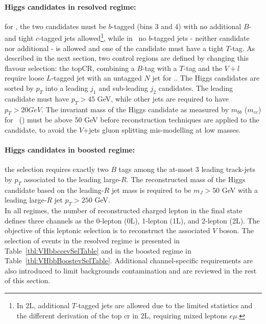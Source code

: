 \paragraph{Higgs candidates in resolved regime:} for \vhb, the two candidates must be $b$-tagged (bins 3 and 4) with no additional $B$- and tight $c$-tagged jets allowed\footnote{In 2L, additional $T$-tagged jets are allowed due to the limited statistics and the different derivation of the top \gls{cr} in 2L, requiring mixed leptons $e\mu$.}, while in \vhc\ no $b$-tagged jets - neither candidate nor additional - is allowed and one of the candidate must have a tight $T$-tag. As described in the next section, two control regions are defined by changing this flavour selection: the topCR, combining a $B$-tag with a $T$-tag and the $V+l$ require loose $L$-tagged jet with an untagged $N$ jet for \vhc.. The Higgs candidates are sorted by $p_T$ into a leading $j_1$ and sub-leading $j_2$ candidates. The leading candidate must have $p_T > 45$ GeV, while other jets are required to have $p_T > 20 GeV$. The invariant mass of the Higgs candidate as measured by $m_{bb}$ ($m_{cc}$) for \vhb\ (\vhc) must be above 50 GeV before reconstruction techniques are applied to the candidate, to avoid the $V$+jets gluon splitting mis-modelling at low masses.  \\ %
\paragraph{Higgs candidates in boosted regime:} the selection requires exactly two $B$ tags among the at-most 3 leading track-jets by $p_T$ associated to the leading large-$R$. The reconstructed mass of the Higgs candidate based on the leading-$R$ jet mass is required to be $m_J > 50$ GeV with a leading large-$R$ jet $p_T > 250$ GeV. \\

In all regimes, the number of reconstructed charged lepton in the final state defines three channels as the 0-lepton (0L), 1-lepton (1L), and 2-lepton (2L). The objective of this leptonic selection is to reconstruct the associated $V$ boson. The selection of events in the resolved regime is presented in Table~\ref{tbl:VHbbccevSelTable} and in the boosted regime in Table~\ref{tbl:VHbbBoostevSelTable}. Additional channel-specific requirements are also introduced to limit backgrounds contamination and are reviewed in the rest of this section.

